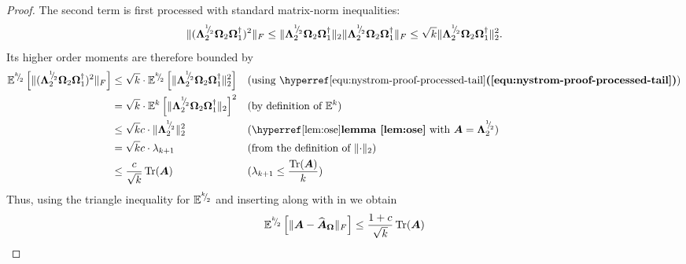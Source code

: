 \documentclass[12pt]{article}
\begin{document}
\begin{proof}
    The second term is first processed with standard matrix-norm inequalities:
    \begin{equation}
        \lVert (\boldsymbol{\Lambda}_2^{{}^{1}{\mskip -5mu/\mskip -3mu}_{2}} \boldsymbol{\Omega}_2 \boldsymbol{\Omega}_1^{\dagger} )^2 \rVert _F 
        \leq \lVert \boldsymbol{\Lambda}_2^{{}^{1}{\mskip -5mu/\mskip -3mu}_{2}} \boldsymbol{\Omega}_2 \boldsymbol{\Omega}_1^{\dagger} \rVert _2 \lVert \boldsymbol{\Lambda}_2^{{}^{1}{\mskip -5mu/\mskip -3mu}_{2}} \boldsymbol{\Omega}_2 \boldsymbol{\Omega}_1^{\dagger} \rVert _F
        \leq \sqrt{k} \lVert \boldsymbol{\Lambda}_2^{{}^{1}{\mskip -5mu/\mskip -3mu}_{2}} \boldsymbol{\Omega}_2 \boldsymbol{\Omega}_1^{\dagger} \rVert _2^2.
        \label{equ:nystrom-proof-processed-tail}
    \end{equation}
    Its higher order moments are therefore bounded by
    \begin{align}
        \mathbb{E}^{\sfrac{k}{2}}\left[ \lVert (\mtx{\Lambda}_2^{\sfrac{1}{2}} \mtx{\Omega}_2 \mtx{\Omega}_1^{\dagger} )^2 \rVert _F \right]
        &\leq \sqrt{k} \cdot \mathbb{E}^{\sfrac{k}{2}}\left[ \lVert \mtx{\Lambda}_2^{\sfrac{1}{2}} \mtx{\Omega}_2 \mtx{\Omega}_1^{\dagger} \rVert _2^2 \right] && \text{(using \refequ{equ:nystrom-proof-processed-tail})} \notag \\
        &= \sqrt{k} \cdot \mathbb{E}^{k}\left[ \lVert \mtx{\Lambda}_2^{\sfrac{1}{2}} \mtx{\Omega}_2 \mtx{\Omega}_1^{\dagger} \rVert _2 \right]^2 && \text{(by definition of $\mathbb{E}^{k}$)} \notag \\
        &\leq \sqrt{k} c \cdot \lVert \mtx{\Lambda}_2^{\sfrac{1}{2}} \rVert _2^2 && \text{(\reflem{lem:ose} with $\mtx{A}=\mtx{\Lambda}_2^{\sfrac{1}{2}}$)} \notag \\
        &= \sqrt{k} c \cdot \lambda_{k+1} && \text{(from the definition of $\lVert \cdot \rVert _2$)} \notag \\
        &\leq \frac{c}{\sqrt{k}} \Trace(\mtx{A}) && \text{($\lambda_{k+1} \leq \frac{\Trace(\mtx{A})}{k}$)}
        \label{equ:nystrom-proof-tail-bound}
    \end{align}
    Thus, using the triangle inequality for $\mathbb{E}^{{}^{k}{\mskip -5mu/\mskip -3mu}_{2}}$ and inserting  along with  in  we obtain
    \begin{equation}
        \mathbb{E}^{{}^{k}{\mskip -5mu/\mskip -3mu}_{2}} \left[\lVert \boldsymbol{A} - \widehat{\boldsymbol{A}}_{\boldsymbol{\Omega}} \rVert _F \right]
        \leq \frac{1 + c}{\sqrt{k}} \operatorname{Tr}(\boldsymbol{A})
    \end{equation}


\end{proof}
\end{document}
